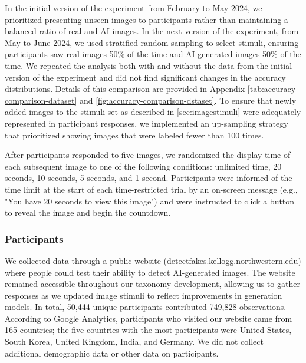 In the initial version of the experiment from February to May 2024, we prioritized presenting unseen images to participants rather than maintaining a balanced ratio of real and AI images. In the next version of the experiment, from May to June 2024, we used stratified random sampling to select stimuli, ensuring participants saw real images 50\% of the time and AI-generated images 50\% of the time. We repeated the analysis both with and without the data from the initial version of the experiment and did not find significant changes in the accuracy distributions. Details of this comparison are provided in Appendix \ref{tab:accuracy-comparison-dataset} and \ref{fig:accuracy-comparison-dstaset}. To ensure that newly added images to the stimuli set as described in \autoref{sec:imagestimuli} were adequately represented in participant responses, we implemented an up-sampling strategy that prioritized showing images that were labeled fewer than 100 times. 

After participants responded to five images, we randomized the display time of each subsequent image to one of the following conditions: unlimited time, 20 seconds, 10 seconds, 5 seconds, and 1 second. Participants were informed of the time limit at the start of each time-restricted trial by an on-screen message (e.g., "You have 20 seconds to view this image") and were instructed to click a button to reveal the image and begin the countdown.

\subsubsection{Participants}

We collected data through a public website (detectfakes.kellogg.northwestern.edu) where people could test their ability to detect AI-generated images. The website remained accessible throughout our taxonomy development, allowing us to gather responses as we updated image stimuli to reflect improvements in generation models. In total, 50,444 unique participants contributed 749,828 observations. According to Google Analytics, participants who visited our website came from 165 countries; the five countries with the most participants were United States, South Korea, United Kingdom, India, and Germany. We did not collect additional demographic data or other data on participants. 


